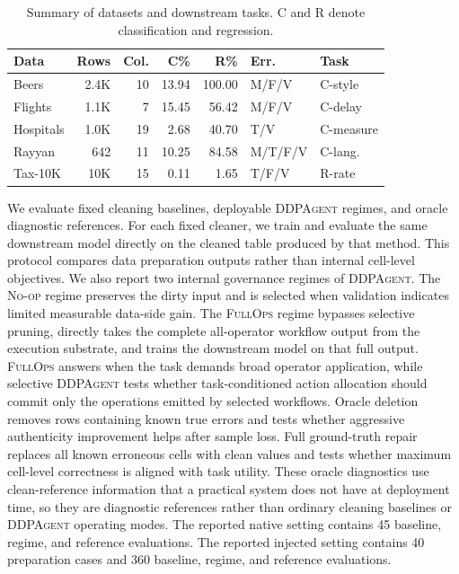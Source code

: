 \documentclass[sigconf, nonacm]{acmart}
\newcommand{\sys}{\textsc{DDPAgent}\xspace}
\newcommand{\noop}{\textsc{No-op}\xspace}
\newcommand{\fullops}{\textsc{FullOps}\xspace}
\begin{document}
\begin{table}[t]
  \caption{Summary of datasets and downstream tasks. C and R denote classification and regression.}
  \label{tab:datasets}
  \centering
  \small
  \begin{tabular}{@{}lrrrrll@{}}
    \toprule
    Data & Rows & Col. & C\% & R\% & Err. & Task \\
    \midrule
    Beers & 2.4K & 10 & 13.94 & 100.00 & M/F/V & C-style \\
    Flights & 1.1K & 7 & 15.45 & 56.42 & M/F/V & C-delay \\
    Hospitals & 1.0K & 19 & 2.68 & 40.70 & T/V & C-measure \\
    Rayyan & 642 & 11 & 10.25 & 84.58 & M/T/F/V & C-lang. \\
    Tax-10K & 10K & 15 & 0.11 & 1.65 & T/F/V & R-rate \\
    \bottomrule
  \end{tabular}
\end{table}

We evaluate fixed cleaning baselines, deployable \sys regimes, and oracle diagnostic references. For each fixed cleaner, we train and evaluate the same downstream model directly on the cleaned table produced by that method. This protocol compares data preparation outputs rather than internal cell-level objectives. We also report two internal governance regimes of \sys. The \noop regime preserves the dirty input and is selected when validation indicates limited measurable data-side gain. The \fullops regime bypasses selective pruning, directly takes the complete all-operator workflow output from the execution substrate, and trains the downstream model on that full output. \fullops answers when the task demands broad operator application, while selective \sys tests whether task-conditioned action allocation should commit only the operations emitted by selected workflows. Oracle deletion removes rows containing known true errors and tests whether aggressive authenticity improvement helps after sample loss. Full ground-truth repair replaces all known erroneous cells with clean values and tests whether maximum cell-level correctness is aligned with task utility. These oracle diagnostics use clean-reference information that a practical system does not have at deployment time, so they are diagnostic references rather than ordinary cleaning baselines or \sys operating modes. The reported native setting contains 45 baseline, regime, and reference evaluations. The reported injected setting contains 40 preparation cases and 360 baseline, regime, and reference evaluations.
\end{document}
